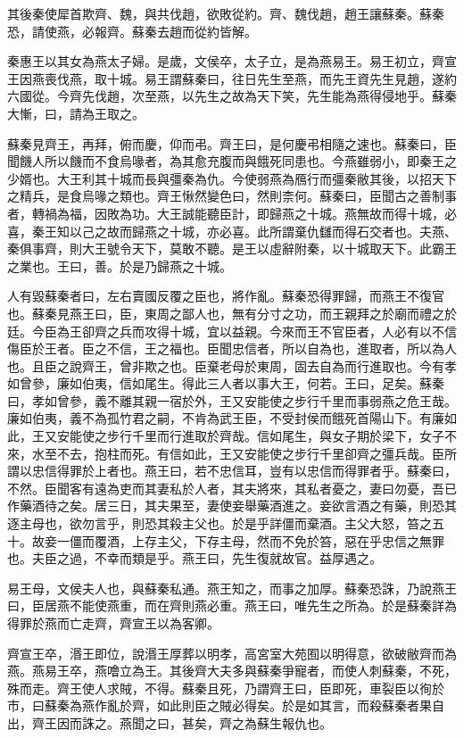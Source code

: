 其後秦使犀首欺齊、魏，與共伐趙，欲敗從約。齊、魏伐趙，趙王讓蘇秦。蘇秦恐，請使燕，必報齊。蘇秦去趙而從約皆解。

秦惠王以其女為燕太子婦。是歲，文侯卒，太子立，是為燕易王。易王初立，齊宣王因燕喪伐燕，取十城。易王謂蘇秦曰，往日先生至燕，而先王資先生見趙，遂約六國從。今齊先伐趙，次至燕，以先生之故為天下笑，先生能為燕得侵地乎。蘇秦大慚，曰，請為王取之。

蘇秦見齊王，再拜，俯而慶，仰而弔。齊王曰，是何慶弔相隨之速也。蘇秦曰，臣聞饑人所以饑而不食烏喙者，為其愈充腹而與餓死同患也。今燕雖弱小，即秦王之少婿也。大王利其十城而長與彊秦為仇。今使弱燕為鴈行而彊秦敝其後，以招天下之精兵，是食烏喙之類也。齊王愀然變色曰，然則柰何。蘇秦曰，臣聞古之善制事者，轉禍為福，因敗為功。大王誠能聽臣計，即歸燕之十城。燕無故而得十城，必喜，秦王知以己之故而歸燕之十城，亦必喜。此所謂棄仇讎而得石交者也。夫燕、秦俱事齊，則大王號令天下，莫敢不聽。是王以虛辭附秦，以十城取天下。此霸王之業也。王曰，善。於是乃歸燕之十城。

人有毀蘇秦者曰，左右賣國反覆之臣也，將作亂。蘇秦恐得罪歸，而燕王不復官也。蘇秦見燕王曰，臣，東周之鄙人也，無有分寸之功，而王親拜之於廟而禮之於廷。今臣為王卻齊之兵而攻得十城，宜以益親。今來而王不官臣者，人必有以不信傷臣於王者。臣之不信，王之福也。臣聞忠信者，所以自為也，進取者，所以為人也。且臣之說齊王，曾非欺之也。臣棄老母於東周，固去自為而行進取也。今有孝如曾參，廉如伯夷，信如尾生。得此三人者以事大王，何若。王曰，足矣。蘇秦曰，孝如曾參，義不離其親一宿於外，王又安能使之步行千里而事弱燕之危王哉。廉如伯夷，義不為孤竹君之嗣，不肯為武王臣，不受封侯而餓死首陽山下。有廉如此，王又安能使之步行千里而行進取於齊哉。信如尾生，與女子期於梁下，女子不來，水至不去，抱柱而死。有信如此，王又安能使之步行千里卻齊之彊兵哉。臣所謂以忠信得罪於上者也。燕王曰，若不忠信耳，豈有以忠信而得罪者乎。蘇秦曰，不然。臣聞客有遠為吏而其妻私於人者，其夫將來，其私者憂之，妻曰勿憂，吾已作藥酒待之矣。居三日，其夫果至，妻使妾舉藥酒進之。妾欲言酒之有藥，則恐其逐主母也，欲勿言乎，則恐其殺主父也。於是乎詳僵而棄酒。主父大怒，笞之五十。故妾一僵而覆酒，上存主父，下存主母，然而不免於笞，惡在乎忠信之無罪也。夫臣之過，不幸而類是乎。燕王曰，先生復就故官。益厚遇之。

易王母，文侯夫人也，與蘇秦私通。燕王知之，而事之加厚。蘇秦恐誅，乃說燕王曰，臣居燕不能使燕重，而在齊則燕必重。燕王曰，唯先生之所為。於是蘇秦詳為得罪於燕而亡走齊，齊宣王以為客卿。

齊宣王卒，湣王即位，說湣王厚葬以明孝，高宮室大苑囿以明得意，欲破敝齊而為燕。燕易王卒，燕噲立為王。其後齊大夫多與蘇秦爭寵者，而使人刺蘇秦，不死，殊而走。齊王使人求賊，不得。蘇秦且死，乃謂齊王曰，臣即死，車裂臣以徇於市，曰蘇秦為燕作亂於齊，如此則臣之賊必得矣。於是如其言，而殺蘇秦者果自出，齊王因而誅之。燕聞之曰，甚矣，齊之為蘇生報仇也。

